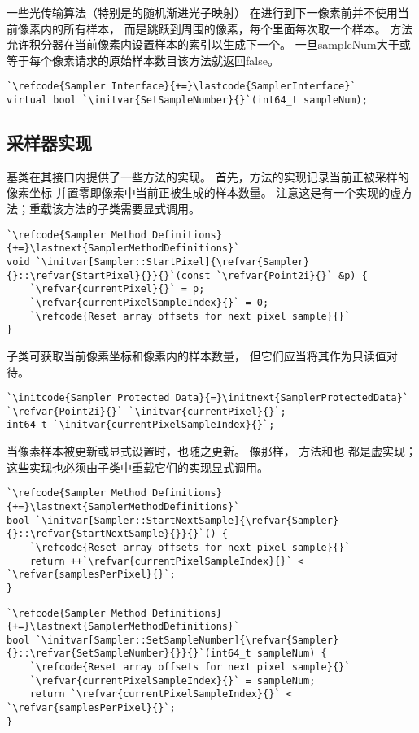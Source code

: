 一些光传输算法（特别是的随机渐进光子映射）
在进行到下一像素前并不使用当前像素内的所有样本，
而是跳跃到周围的像素，每个里面每次取一个样本。
方法允许积分器在当前像素内设置样本的索引以生成下一个。
一旦{\ttfamily sampleNum}大于或等于每个像素请求的原始样本数目该方法就返回{\ttfamily false}。
\begin{lstlisting}
`\refcode{Sampler Interface}{+=}\lastcode{SamplerInterface}`
virtual bool `\initvar{SetSampleNumber}{}`(int64_t sampleNum);
\end{lstlisting}

\subsection{采样器实现}\label{sub:采样器实现}
基类在其接口内提供了一些方法的实现。
首先，方法的实现记录当前正被采样的像素坐标
并置零即像素中当前正被生成的样本数量。
注意这是有一个实现的虚方法；重载该方法的子类需要显式调用。
\begin{lstlisting}
`\refcode{Sampler Method Definitions}{+=}\lastnext{SamplerMethodDefinitions}`
void `\initvar[Sampler::StartPixel]{\refvar{Sampler}{}::\refvar{StartPixel}{}}{}`(const `\refvar{Point2i}{}` &p) {
    `\refvar{currentPixel}{}` = p;
    `\refvar{currentPixelSampleIndex}{}` = 0;
    `\refcode{Reset array offsets for next pixel sample}{}`
}
\end{lstlisting}

子类可获取当前像素坐标和像素内的样本数量，
但它们应当将其作为只读值对待。
\begin{lstlisting}
`\initcode{Sampler Protected Data}{=}\initnext{SamplerProtectedData}`
`\refvar{Point2i}{}` `\initvar{currentPixel}{}`;
int64_t `\initvar{currentPixelSampleIndex}{}`;
\end{lstlisting}

当像素样本被更新或显式设置时，也随之更新。
像那样，
方法和也
都是虚实现；这些实现也必须由子类中重载它们的实现显式调用。
\begin{lstlisting}
`\refcode{Sampler Method Definitions}{+=}\lastnext{SamplerMethodDefinitions}`
bool `\initvar[Sampler::StartNextSample]{\refvar{Sampler}{}::\refvar{StartNextSample}{}}{}`() {
    `\refcode{Reset array offsets for next pixel sample}{}`
    return ++`\refvar{currentPixelSampleIndex}{}` < `\refvar{samplesPerPixel}{}`;
}
\end{lstlisting}
\begin{lstlisting}
`\refcode{Sampler Method Definitions}{+=}\lastnext{SamplerMethodDefinitions}`
bool `\initvar[Sampler::SetSampleNumber]{\refvar{Sampler}{}::\refvar{SetSampleNumber}{}}{}`(int64_t sampleNum) {
    `\refcode{Reset array offsets for next pixel sample}{}`
    `\refvar{currentPixelSampleIndex}{}` = sampleNum;
    return `\refvar{currentPixelSampleIndex}{}` < `\refvar{samplesPerPixel}{}`;
}
\end{lstlisting}

